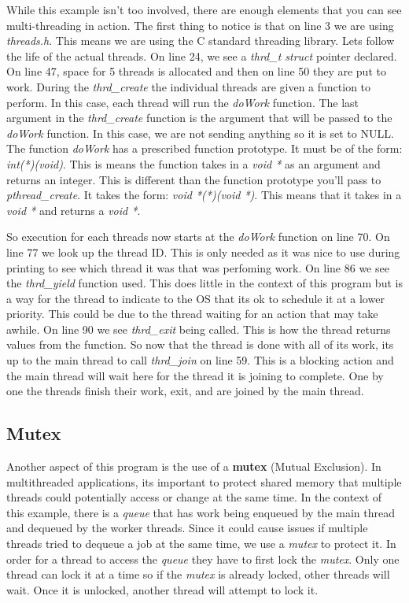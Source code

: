 \documentclass[../main.tex]{subfiles}
\begin{document}
	While this example isn't too involved, there are enough elements that you can see multi-threading in action.  The first thing to notice is that on line 3 we are using \textit{threads.h}.  This means we are using the C standard threading library. Lets follow the life of the actual threads.  On line 24, we see a \textit{thrd\_t struct} pointer declared.  On line 47, space for 5 threads is allocated and then on line 50 they are put to work.  During the \textit{thrd\_create} the individual threads are given a function to perform.  In this case, each thread will run the \textit{doWork} function.  The last argument in the \textit{thrd\_create} function is the argument that will be passed to the \textit{doWork} function.  In this case, we are not sending anything so it is set to NULL.  The function \textit{doWork} has a prescribed function prototype.  It must be of the form: \textit{int(*)(void\*)}.  This is means the function takes in a \textit{void *} as an argument and returns an integer.  This is different than the function prototype you'll pass to \textit{pthread\_create}.  It takes the form: \textit{void *(*)(void *)}.  This means that it takes in a \textit{void *} and returns a \textit{void *}. 
	
	So execution for each threads now starts at the \textit{doWork} function on line 70.  On line 77 we look up the thread ID.  This is only needed as it was nice to use during printing to see which thread it was that was perfoming work.  On line 86 we see the \textit{thrd\_yield} function used.  This does little in the context of this program but is a way for the thread to indicate to the OS that its ok to schedule it at a lower priority.  This could be due to the thread waiting for an action that may take awhile.  On line 90 we see \textit{thrd\_exit} being called.  This is how the thread returns values from the function.  So now that the thread is done with all of its work, its up to the main thread to call \textit{thrd\_join} on line 59.  This is a blocking action and the main thread will wait here for the thread it is joining to complete.  One by one the threads finish their work, exit, and are joined by the main thread.
	
	\subsection{Mutex}
	
	Another aspect of this program is the use of a \textbf{mutex} (Mutual Exclusion).  In multithreaded applications, its important to protect shared memory that multiple threads could potentially access or change at the same time.  In the context of this example, there is a \textit{queue} that has work being enqueued by the main thread and dequeued by the worker threads.  Since it could cause issues if multiple threads tried to dequeue a job at the same time, we use a \textit{mutex} to protect it.  In order for a thread to access the \textit{queue} they have to first lock the \textit{mutex}.  Only one thread can lock it at a time so if the \textit{mutex} is already locked, other threads will wait.  Once it is unlocked, another thread will attempt to lock it.
	
\end{document}
